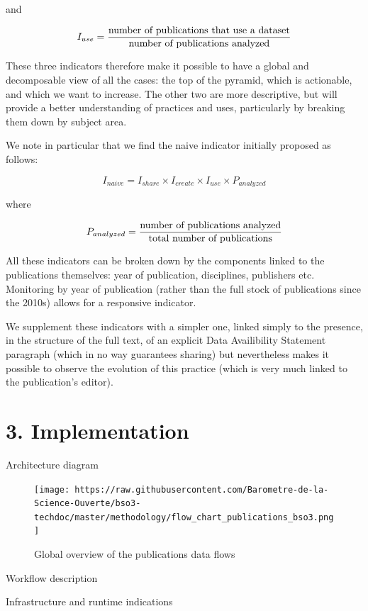 \documentclass[
]{article}
\begin{document}
and

\[ I_{use} = {\text{number of publications that use a dataset} \over \text{number of publications analyzed}} \]

These three indicators therefore make it possible to have a global and
decomposable view of all the cases: the top of the pyramid, which is
actionable, and which we want to increase. The other two are more
descriptive, but will provide a better understanding of practices and
uses, particularly by breaking them down by subject area.

We note in particular that we find the naive indicator initially
proposed as follows:

\[ I_{naive} = I_{share} \times I_{create} \times I_{use} \times P_{analyzed} \]

where

\[ P_{analyzed} = {\text{number of publications analyzed} \over \text{total number of publications}} \]

All these indicators can be broken down by the components linked to the
publications themselves: year of publication, disciplines, publishers
etc. Monitoring by year of publication (rather than the full stock of
publications since the 2010s) allows for a responsive indicator.

We supplement these indicators with a simpler one, linked simply to the
presence, in the structure of the full text, of an explicit Data
Availibility Statement paragraph (which in no way guarantees sharing)
but nevertheless makes it possible to observe the evolution of this
practice (which is very much linked to the publication's editor).

\newpage

\hypertarget{implementation}{%
\section{3. Implementation}\label{implementation}}

Architecture diagram

\begin{figure}
\centering
\texttt{[image: https://raw.githubusercontent.com/Barometre-de-la-Science-Ouverte/bso3-techdoc/master/methodology/flow\_chart\_publications\_bso3.png]}
\caption{Global overview of the publications data flows}
\end{figure}

Workflow description

Infrastructure and runtime indications
\end{document}
